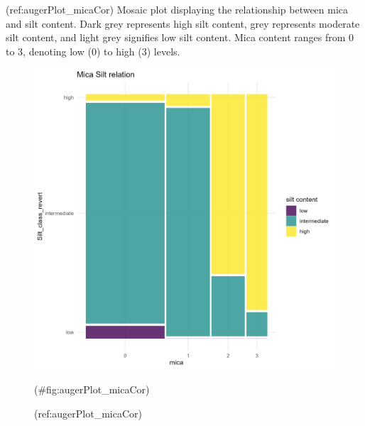 \documentclass[fleqn,12pt]{latex/stylish_article} %
\begin{document}
\normalsize

(ref:augerPlot\_micaCor) Mosaic plot displaying the relationship between mica and silt content. Dark grey represents high silt content, grey represents moderate silt content, and light grey signifies low silt content. Mica content ranges from 0 to 3, denoting low (0) to high (3) levels.

\scriptsize

\begin{figure}

{\centering \includegraphics[width=0.9\linewidth]{images/augerPlot_micaCor} 

}

\caption{(ref:augerPlot_micaCor)}(\#fig:augerPlot_micaCor)
\end{figure}

\normalsize



\makeatletter

\makeatother


\end{document}
